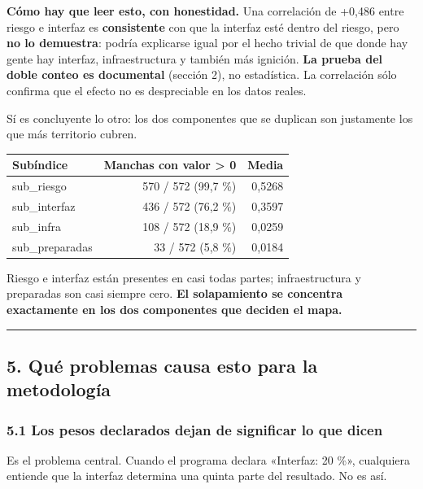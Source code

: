 \documentclass[
  spanish,
  10pt,
]{article}
\begin{document}
\textbf{Cómo hay que leer esto, con honestidad.} Una correlación de
+0,486 entre riesgo e interfaz es \textbf{consistente} con que la
interfaz esté dentro del riesgo, pero \textbf{no lo demuestra}: podría
explicarse igual por el hecho trivial de que donde hay gente hay
interfaz, infraestructura y también más ignición. \textbf{La prueba del
doble conteo es documental} (sección 2), no estadística. La correlación
sólo confirma que el efecto no es despreciable en los datos reales.

Sí es concluyente lo otro: los dos componentes que se duplican son
justamente los que más territorio cubren.

\begin{longtable}[]{@{}lrr@{}}
\toprule\noalign{}
Subíndice & Manchas con valor \textgreater{} 0 & Media \\
\midrule\noalign{}
\endhead
\bottomrule\noalign{}
\endlastfoot
sub\_riesgo & 570 / 572 (99,7 \%) & 0,5268 \\
sub\_interfaz & 436 / 572 (76,2 \%) & 0,3597 \\
sub\_infra & 108 / 572 (18,9 \%) & 0,0259 \\
sub\_preparadas & 33 / 572 (5,8 \%) & 0,0184 \\
\end{longtable}

Riesgo e interfaz están presentes en casi todas partes; infraestructura
y preparadas son casi siempre cero. \textbf{El solapamiento se concentra
exactamente en los dos componentes que deciden el mapa.}

\begin{center}\rule{0.5\linewidth}{0.5pt}\end{center}

\subsection{5. Qué problemas causa esto para la
metodología}\label{quuxe9-problemas-causa-esto-para-la-metodologuxeda}

\subsubsection{5.1 Los pesos declarados dejan de significar lo que
dicen}\label{los-pesos-declarados-dejan-de-significar-lo-que-dicen}

Es el problema central. Cuando el programa declara «Interfaz: 20 \%»,
cualquiera entiende que la interfaz determina una quinta parte del
resultado. No es así.
\end{document}
